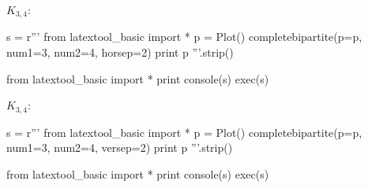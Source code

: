 $K_{3,4}$:
\begin{python}
s = r'''
from latextool_basic import *
p = Plot()
completebipartite(p=p, num1=3, num2=4, horsep=2)
print p
'''.strip()

from latextool_basic import *
print console(s)
exec(s)
\end{python}


$K_{3,4}$:
\begin{python}
s = r'''
from latextool_basic import *
p = Plot()
completebipartite(p=p, num1=3, num2=4, versep=2)
print p
'''.strip()

from latextool_basic import *
print console(s)
exec(s)
\end{python}

